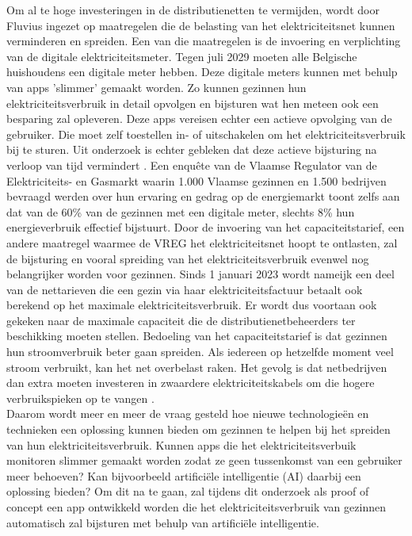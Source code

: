 \newpage
Om al te hoge investeringen in de distributienetten te vermijden, wordt door Fluvius ingezet op maatregelen die de belasting van het elektriciteitsnet kunnen verminderen en spreiden. Een van die maatregelen is de invoering en verplichting van de digitale elektriciteitsmeter. Tegen juli 2029 moeten alle Belgische huishoudens een digitale meter hebben. Deze digitale meters kunnen met behulp van apps 'slimmer' gemaakt worden. Zo kunnen gezinnen hun elektriciteitsverbruik in detail opvolgen en bijsturen wat hen meteen ook een besparing zal opleveren. Deze apps vereisen echter een actieve opvolging van de gebruiker. Die moet zelf toestellen in- of uitschakelen om het elektriciteitsverbruik bij te sturen. Uit onderzoek is echter gebleken dat deze actieve bijsturing na verloop van tijd vermindert \autocite{Wemyss2019}. Een enquête van de Vlaamse Regulator van de Elektriciteits- en Gasmarkt \textcite{VREG2021} waarin 1.000 Vlaamse gezinnen en 1.500 bedrijven bevraagd werden over hun ervaring en gedrag op de energiemarkt toont zelfs aan dat van de 60\% van de gezinnen met een digitale meter, slechts 8\% hun energieverbruik effectief bijstuurt. Door de invoering van het capaciteitstarief, een andere maatregel waarmee de VREG het elektriciteitsnet hoopt te ontlasten, zal de bijsturing en vooral spreiding van het elektriciteitsverbruik evenwel nog belangrijker worden voor gezinnen. Sinds 1 januari 2023 wordt nameijk een deel van de nettarieven die een gezin via haar elektriciteitsfactuur betaalt ook berekend op het maximale elektriciteitsverbruik. Er wordt dus voortaan ook gekeken naar de maximale capaciteit die de distributienetbeheerders ter beschikking moeten stellen. Bedoeling van het capaciteitstarief is dat gezinnen hun stroomverbruik beter gaan spreiden. Als iedereen op hetzelfde moment veel stroom verbruikt, kan het net overbelast raken. Het gevolg is dat netbedrijven dan extra moeten investeren in zwaardere elektriciteitskabels om die hogere verbruikspieken op te vangen \autocite{Selleslagh2022}. \\

Daarom wordt meer en meer de vraag gesteld hoe nieuwe technologieën en technieken een oplossing kunnen bieden om gezinnen te helpen bij het spreiden van hun elektriciteitsverbruik. Kunnen apps die het elektriciteitsverbuik monitoren slimmer gemaakt worden zodat ze geen tussenkomst van een gebruiker meer behoeven? Kan bijvoorbeeld artificiële intelligentie (AI) daarbij een oplossing bieden? Om dit na te gaan, zal tijdens dit onderzoek als proof of concept een app ontwikkeld worden die het elektriciteitsverbruik van gezinnen automatisch zal bijsturen met behulp van artificiële intelligentie.

